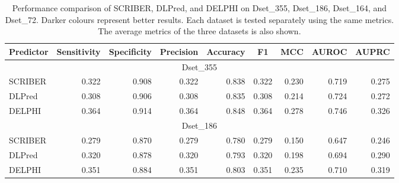 \documentclass{bioinfo}
\begin{document}
\begin{table*}
  \centering
  \caption{Performance comparison of SCRIBER, DLPred, and DELPHI on Dset\_355, Dset\_186, Dset\_164, and Dset\_72. Darker colours represent better results. Each dataset is tested separately using the same metrics. The average metrics of the three datasets is also shown.}
    \begin{tabular}{|lrrrrrrrr|}
    \toprule
    Predictor & \multicolumn{1}{c}{Sensitivity} & \multicolumn{1}{c}{Specificity} & \multicolumn{1}{c}{Precision} & \multicolumn{1}{c}{Accuracy} & \multicolumn{1}{c}{F1} & \multicolumn{1}{c}{MCC} & \multicolumn{1}{c}{AUROC} & \multicolumn{1}{c|}{AUPRC} \\
    \midrule
    \multicolumn{9}{|c|}{Dset\_355} \\
    \midrule
    SCRIBER & \cellcolor[rgb]{ .835,  .882,  .808}0.322 & \cellcolor[rgb]{ .847,  .886,  .816}0.908 & \cellcolor[rgb]{ .839,  .882,  .808}0.322 & \cellcolor[rgb]{ .847,  .89,  .82}0.838 & \cellcolor[rgb]{ .839,  .882,  .808}0.322 & \cellcolor[rgb]{ .839,  .882,  .808}0.230 & 0.719 & \cellcolor[rgb]{ .961,  .973,  .953}0.275 \\
    DLPred & 0.308 & 0.906 & 0.308 & 0.835 & 0.308 & 0.214 & \cellcolor[rgb]{ .89,  .922,  .871}0.724 & 0.272 \\
    DELPHI & \cellcolor[rgb]{ .329,  .51,  .208}0.364 & \cellcolor[rgb]{ .329,  .51,  .208}0.914 & \cellcolor[rgb]{ .329,  .51,  .208}0.364 & \cellcolor[rgb]{ .329,  .51,  .208}0.848 & \cellcolor[rgb]{ .329,  .51,  .208}0.364 & \cellcolor[rgb]{ .329,  .51,  .208}0.278 & \cellcolor[rgb]{ .329,  .51,  .208}0.746 & \cellcolor[rgb]{ .329,  .51,  .208}0.326 \\
    \midrule
    \multicolumn{9}{|c|}{Dset\_186} \\
    \midrule
    SCRIBER & 0.279 & 0.870 & 0.279 & 0.780 & 0.279 & 0.150 & 0.647 & 0.246 \\
    DLPred & \cellcolor[rgb]{ .62,  .722,  .549}0.320 & \cellcolor[rgb]{ .631,  .729,  .565}0.878 & \cellcolor[rgb]{ .62,  .722,  .549}0.320 & \cellcolor[rgb]{ .631,  .729,  .561}0.793 & \cellcolor[rgb]{ .62,  .722,  .549}0.320 & \cellcolor[rgb]{ .62,  .722,  .553}0.198 & \cellcolor[rgb]{ .498,  .631,  .404}0.694 & \cellcolor[rgb]{ .6,  .71,  .529}0.290 \\
    DELPHI & \cellcolor[rgb]{ .329,  .51,  .208}0.351 & \cellcolor[rgb]{ .329,  .51,  .208}0.884 & \cellcolor[rgb]{ .329,  .51,  .208}0.351 & \cellcolor[rgb]{ .329,  .51,  .208}0.803 & \cellcolor[rgb]{ .329,  .51,  .208}0.351 & \cellcolor[rgb]{ .329,  .51,  .208}0.235 & \cellcolor[rgb]{ .329,  .51,  .208}0.710 & \cellcolor[rgb]{ .329,  .51,  .208}0.319 \\

\end{tabular}
\end{table*}
\end{document}
